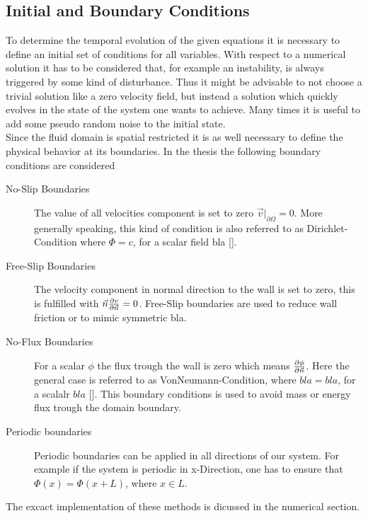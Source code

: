 \subsection{Initial and Boundary Conditions}

To determine the temporal evolution of the given equations it is necessary to define an initial set of conditions for all variables.
With respect to a numerical solution it has to be considered that, for example an instability, is always triggered by some kind of disturbance.
Thus it might be advisable to not choose a trivial solution like a zero velocity field, but instead a solution which quickly evolves in the state
of the system one wants to achieve. Many times it is useful to add some pseudo random noise to the initial state.\\
Since the fluid domain is spatial restricted it is as well necessary to define the physical behavior at its boundaries.
In the thesis the following boundary conditions are considered


\begin{description}
    \item[No-Slip Boundaries] The value of all velocities component is set to zero $\vec{v}|_{\partial \Omega} = 0$.
                              More generally speaking, this kind of condition is  also referred to as Dirichlet-Condition where $\Phi=c $, for a scalar field bla [].
    \item[Free-Slip Boundaries] The velocity component in normal direction to the wall is set to zero, this is fulfilled with $\vec{n}\pdn[v]{\vec{n}} = 0$.
                                Free-Slip boundaries are used to reduce wall friction or to mimic symmetric bla.
    \item[No-Flux Boundaries] For a scalar $\phi$ the flux trough the wall is zero which means $\pdn[\phi]{\vec{n}}$.
                              Here the general case is referred to as VonNeumann-Condition, where $bla=bla$, for a scalalr $bla$  [].
                              This boundary conditions is used to avoid mass or energy flux trough the domain boundary.
    \item[Periodic boundaries] Periodic boundaries can be applied in all directions of our system. For example if the system is periodic in x-Direction,
                                one has to ensure that $\Phi(x) = \Phi(x + L)$, where $x \in L$.

\end{description}

The excact implementation of these methods is dicussed in the numerical section.

